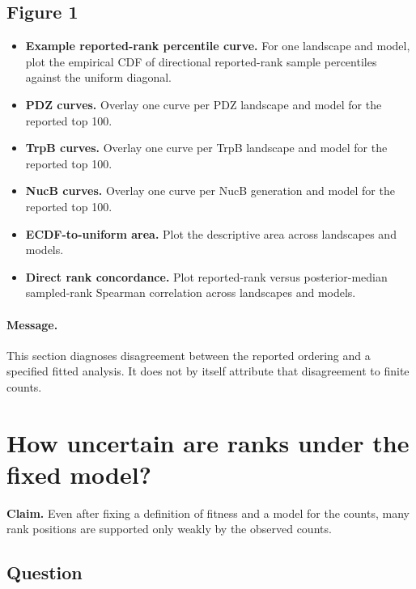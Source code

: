 \documentclass[11pt]{article}
\begin{document}
\subsection*{Figure 1}

\begin{itemize}
  \item[\textbf{(a)}] \textbf{Example reported-rank percentile curve.} For one landscape and model, plot the empirical CDF of directional reported-rank sample percentiles against the uniform diagonal.
  \item[\textbf{(b)}] \textbf{PDZ curves.} Overlay one curve per PDZ landscape and model for the reported top 100.
  \item[\textbf{(c)}] \textbf{TrpB curves.} Overlay one curve per TrpB landscape and model for the reported top 100.
  \item[\textbf{(d)}] \textbf{NucB curves.} Overlay one curve per NucB generation and model for the reported top 100.
  \item[\textbf{(e)}] \textbf{ECDF-to-uniform area.} Plot the descriptive area across landscapes and models.
  \item[\textbf{(f)}] \textbf{Direct rank concordance.} Plot reported-rank versus posterior-median sampled-rank Spearman correlation across landscapes and models.
\end{itemize}

\paragraph{Message.}
This section diagnoses disagreement between the reported ordering and a specified fitted analysis. It does not by itself attribute that disagreement to finite counts.

\section{How uncertain are ranks under the fixed model?}

\begin{callout}
\textbf{Claim.}
Even after fixing a definition of fitness and a model for the counts, many rank positions are supported only weakly by the observed counts.
\end{callout}

\subsection*{Question}
\end{document}
